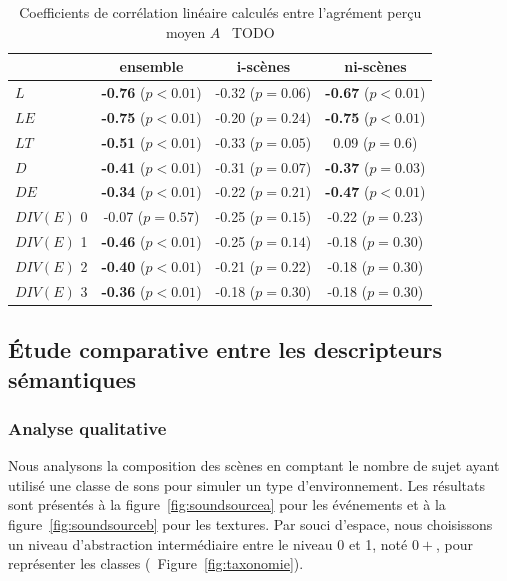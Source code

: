 \begin{table}[t]
\centering
\begin{tabular}{l c c c} 
            & ensemble                     & i-scènes                   & ni-scènes    \\
\hline
$L$         & \textbf{-0.76} ($p<0.01$)    & -0.32 ($p=0.06$)           & \textbf{-0.67} ($p<0.01$)\\
$LE$        & \textbf{-0.75} ($p<0.01$)    & -0.20 ($p=0.24$)           & \textbf{-0.75} ($p<0.01$)\\
$LT$        & \textbf{-0.51} ($p<0.01$)    & -0.33 ($p=0.05$)           &  0.09  ($p=0.6$) \\
$D$         & \textbf{-0.41} ($p<0.01$)    & -0.31 ($p=0.07$)           & \textbf{-0.37} ($p=0.03$)\\
$DE$        & \textbf{-0.34} ($p<0.01$)    & -0.22 ($p=0.21$)           & \textbf{-0.47} ($p<0.01$)\\
$DIV(E)$ 0     &          -0.07 ($p=0.57$)    & -0.25 ($p=0.15$)           & -0.22 ($p=0.23$)\\
$DIV(E)$ 1     & \textbf{-0.46} ($p<0.01$)    & -0.25 ($p=0.14$)           & -0.18 ($p=0.30$)\\
$DIV(E)$ 2     & \textbf{-0.40} ($p<0.01$)    & -0.21 ($p=0.22$)           & -0.18 ($p=0.30$)\\
$DIV(E)$ 3     & \textbf{-0.36} ($p<0.01$)    & -0.18 ($p=0.30$)           & -0.18 ($p=0.30$)\\
\hline
\end{tabular}
\vspace{0.5mm}
\caption{Coefficients de corrélation linéaire calculés entre l'agrément perçu moyen $A$ \vs~TODO}
\label{tab:corrStructA}
\end{table}

\subsection{Étude comparative entre les descripteurs sémantiques}

\subsubsection{Analyse qualitative}

Nous analysons la composition des scènes en comptant le nombre de sujet ayant utilisé une classe de sons pour simuler un type d'environnement. Les résultats sont présentés à la figure~\ref{fig:soundsourcea} pour les événements et à la figure~\ref{fig:soundsourceb} pour les textures. Par souci d'espace, nous choisissons un niveau d'abstraction intermédiaire entre le niveau 0 et 1, noté $0+$, pour représenter les classes (\cf~Figure~\ref{fig:taxonomie}).

